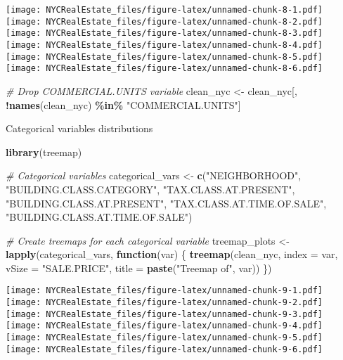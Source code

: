 \documentclass[
]{article}
\newenvironment{Shaded}{\begin{snugshade}}{\end{snugshade}}
\newcommand{\AttributeTok}[1]{\textcolor[rgb]{0.13,0.29,0.53}{#1}}
\newcommand{\CommentTok}[1]{\textcolor[rgb]{0.56,0.35,0.01}{\textit{#1}}}
\newcommand{\ControlFlowTok}[1]{\textcolor[rgb]{0.13,0.29,0.53}{\textbf{#1}}}
\newcommand{\FunctionTok}[1]{\textcolor[rgb]{0.13,0.29,0.53}{\textbf{#1}}}
\newcommand{\NormalTok}[1]{#1}
\newcommand{\OtherTok}[1]{\textcolor[rgb]{0.56,0.35,0.01}{#1}}
\newcommand{\SpecialCharTok}[1]{\textcolor[rgb]{0.81,0.36,0.00}{\textbf{#1}}}
\newcommand{\StringTok}[1]{\textcolor[rgb]{0.31,0.60,0.02}{#1}}
\begin{document}
\texttt{[image: NYCRealEstate\_files/figure-latex/unnamed-chunk-8-1.pdf]}
\texttt{[image: NYCRealEstate\_files/figure-latex/unnamed-chunk-8-2.pdf]}
\texttt{[image: NYCRealEstate\_files/figure-latex/unnamed-chunk-8-3.pdf]}
\texttt{[image: NYCRealEstate\_files/figure-latex/unnamed-chunk-8-4.pdf]}
\texttt{[image: NYCRealEstate\_files/figure-latex/unnamed-chunk-8-5.pdf]}
\texttt{[image: NYCRealEstate\_files/figure-latex/unnamed-chunk-8-6.pdf]}

\begin{Shaded}
\begin{Highlighting}[]
\CommentTok{\# Drop COMMERCIAL.UNITS variable}
\NormalTok{clean\_nyc }\OtherTok{\textless{}{-}}\NormalTok{ clean\_nyc[, }\SpecialCharTok{!}\FunctionTok{names}\NormalTok{(clean\_nyc) }\SpecialCharTok{\%in\%} \StringTok{"COMMERCIAL.UNITS"}\NormalTok{]}
\end{Highlighting}
\end{Shaded}

Categorical variables distributions

\begin{Shaded}
\begin{Highlighting}[]
\FunctionTok{library}\NormalTok{(treemap)}

\CommentTok{\# Categorical variables}
\NormalTok{categorical\_vars }\OtherTok{\textless{}{-}} \FunctionTok{c}\NormalTok{(}\StringTok{"NEIGHBORHOOD"}\NormalTok{, }\StringTok{"BUILDING.CLASS.CATEGORY"}\NormalTok{, }
                      \StringTok{"TAX.CLASS.AT.PRESENT"}\NormalTok{, }\StringTok{"BUILDING.CLASS.AT.PRESENT"}\NormalTok{, }
                      \StringTok{"TAX.CLASS.AT.TIME.OF.SALE"}\NormalTok{, }\StringTok{"BUILDING.CLASS.AT.TIME.OF.SALE"}\NormalTok{)}

\CommentTok{\# Create treemaps for each categorical variable}
\NormalTok{treemap\_plots }\OtherTok{\textless{}{-}} \FunctionTok{lapply}\NormalTok{(categorical\_vars, }\ControlFlowTok{function}\NormalTok{(var) \{}
  \FunctionTok{treemap}\NormalTok{(clean\_nyc, }\AttributeTok{index =}\NormalTok{ var, }\AttributeTok{vSize =} \StringTok{"SALE.PRICE"}\NormalTok{, }\AttributeTok{title =} \FunctionTok{paste}\NormalTok{(}\StringTok{"Treemap of"}\NormalTok{, var))}
\NormalTok{\})}
\end{Highlighting}
\end{Shaded}

\texttt{[image: NYCRealEstate\_files/figure-latex/unnamed-chunk-9-1.pdf]}
\texttt{[image: NYCRealEstate\_files/figure-latex/unnamed-chunk-9-2.pdf]}
\texttt{[image: NYCRealEstate\_files/figure-latex/unnamed-chunk-9-3.pdf]}
\texttt{[image: NYCRealEstate\_files/figure-latex/unnamed-chunk-9-4.pdf]}
\texttt{[image: NYCRealEstate\_files/figure-latex/unnamed-chunk-9-5.pdf]}
\texttt{[image: NYCRealEstate\_files/figure-latex/unnamed-chunk-9-6.pdf]}
\end{document}
